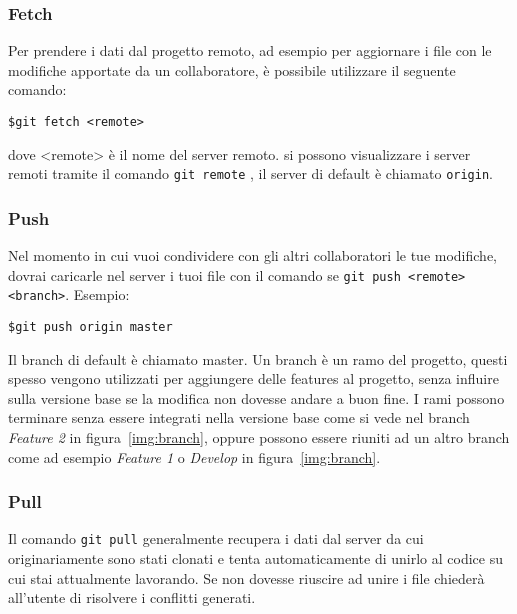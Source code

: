 			\subsubsection*{Fetch}
				Per prendere i dati dal progetto remoto, ad esempio per aggiornare i file con le modifiche apportate da un collaboratore, è possibile utilizzare il seguente comando:
				\begin{tcolorbox}
					\texttt{\$\qquad git fetch <remote>}
				\end{tcolorbox}
				dove <remote> è il nome del server remoto. si possono visualizzare i server remoti tramite il comando \verb|git remote| , il server di default è chiamato \verb|origin|.
			
			
			\subsubsection*{Push}
				Nel momento in cui vuoi condividere con gli altri collaboratori le tue modifiche, dovrai caricarle nel server i tuoi file con il comando se \texttt{git push <remote> <branch>}. Esempio:
				\begin{tcolorbox}
					\texttt{\$\qquad git push origin master}
				\end{tcolorbox}
				Il branch di default è chiamato master. Un branch è un ramo del progetto, questi spesso vengono utilizzati per aggiungere delle features al progetto, senza influire sulla versione base se la modifica non dovesse andare a buon fine. I rami possono terminare senza essere integrati nella versione base come si vede nel branch \textit{Feature 2} in figura~\ref{img:branch}, oppure possono essere riuniti ad un altro branch come ad esempio \textit{Feature 1} o \textit{Develop} in figura~\ref{img:branch}.
				
				\begin{center}
					\label{img:branch}
				\end{center}
			
			\subsubsection*{Pull}
				Il comando \verb|git pull| generalmente recupera i dati dal server da cui originariamente sono stati clonati e tenta automaticamente di unirlo al codice su cui stai attualmente lavorando. Se non dovesse riuscire ad unire i file chiederà all'utente di risolvere i conflitti generati.

